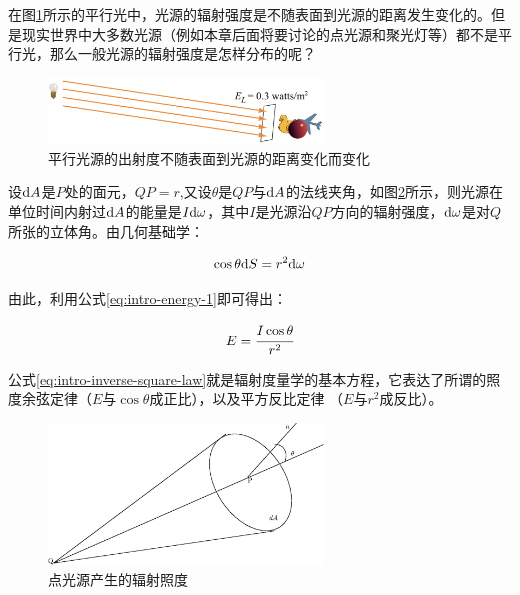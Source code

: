 在图\ref{f:intro-directional-irradiance}所示的平行光中，光源的辐射强度是不随表面到光源的距离发生变化的。但是现实世界中大多数光源（例如本章后面将要讨论的点光源和聚光灯等）都不是平行光，那么一般光源的辐射强度是怎样分布的呢？

\begin{figure}
\sidecaption
	\includegraphics[width=0.65\textwidth]{figures/intro/directional-irradiance}
	\caption{平行光源的出射度不随表面到光源的距离变化而变化}
	\label{f:intro-directional-irradiance}
\end{figure}

设${\rm d}A$是$P$处的面元，$QP=r$,又设$\theta$是$QP$与${\rm d}A$的法线夹角，如图\ref{f:intro-inverse-square-law}所示，则光源在单位时间内射过${\rm d}A$的能量是$I{\rm d}\omega$，其中$I$是光源沿$QP$方向的辐射强度，${\rm d}\omega$是对$Q$所张的立体角。由几何基础学：

\begin{equation}
	\cos\theta {\rm d}S=r^{2}{\rm d}\omega
\end{equation}


\noindent 由此，利用公式\ref{eq:intro-energy-1}即可得出：

\begin{equation}\label{eq:intro-inverse-square-law}
	E= \cfrac{I\cos\theta}{r^{2}}
\end{equation}

\noindent 公式\ref{eq:intro-inverse-square-law}就是辐射度量学的基本方程，它表达了所谓的照度余弦定律（$E$与$\cos\theta$成正比），以及平方反比定律 （$E$与$r^{2}$成反比）。

\begin{figure}
\sidecaption
	\includegraphics[width=0.65\textwidth]{figures/intro/inverse-square-law}
	\caption{点光源产生的辐射照度}
	\label{f:intro-inverse-square-law}
\end{figure}

